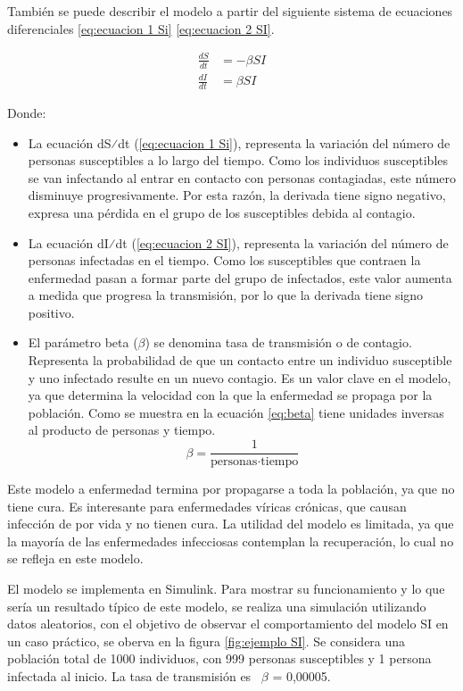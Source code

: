 También se puede describir el modelo a partir del siguiente sistema de ecuaciones diferenciales \eqref{eq:ecuacion 1 Si} \eqref{eq:ecuacion 2 SI}.

\begin{align}
\frac{dS}{dt} &= -\beta SI \label{eq:ecuacion 1 Si} \\
\frac{dI}{dt} &= \beta SI \label{eq:ecuacion 2 SI}
\end{align}

Donde:
\begin{itemize}
    \item 	La ecuación dS⁄dt (\ref{eq:ecuacion 1 Si}), representa la variación del número de personas susceptibles a lo largo del tiempo. Como los individuos susceptibles se van infectando al entrar en contacto con personas contagiadas, este número disminuye progresivamente. Por esta razón, la derivada tiene signo negativo, expresa una pérdida en el grupo de los susceptibles debida al contagio.
    \item 	La ecuación dI⁄dt (\ref{eq:ecuacion 2 SI}), representa la variación del número de personas infectadas en el tiempo. Como los susceptibles que contraen la enfermedad pasan a formar parte del grupo de infectados, este valor aumenta a medida que progresa la transmisión, por lo que la derivada tiene signo positivo.
    \item El parámetro beta ($\beta$) se denomina tasa de transmisión o de contagio. Representa la probabilidad de que un contacto entre un individuo susceptible y uno infectado resulte en un nuevo contagio. Es un valor clave en el modelo, ya que determina la velocidad con la que la enfermedad se propaga por la población. Como se muestra en la ecuación \eqref{eq:beta} tiene unidades inversas al producto de personas y tiempo.
    \begin{equation}
    \beta = \frac{1}{\text{personas} \cdot \text{tiempo}}
    \label{eq:beta}
    \end{equation}
\end{itemize}

 



Este modelo a enfermedad termina por propagarse a toda la población, ya que no tiene cura. Es interesante para enfermedades víricas crónicas, que causan infección de por vida y no tienen cura. La utilidad del modelo es limitada, ya que la mayoría de las enfermedades infecciosas contemplan la recuperación, lo cual no se refleja en este modelo.

El modelo se implementa en Simulink. Para mostrar su funcionamiento y lo que sería un resultado típico de este modelo, se realiza una simulación utilizando datos aleatorios, con el objetivo de observar el comportamiento del modelo SI en un caso práctico, se oberva en la figura \ref{fig:ejemplo SI}. Se considera una población total de 1000 individuos, con 999 personas susceptibles y 1 persona infectada al inicio. La tasa de transmisión es ~$\beta$ = 0,00005. 

